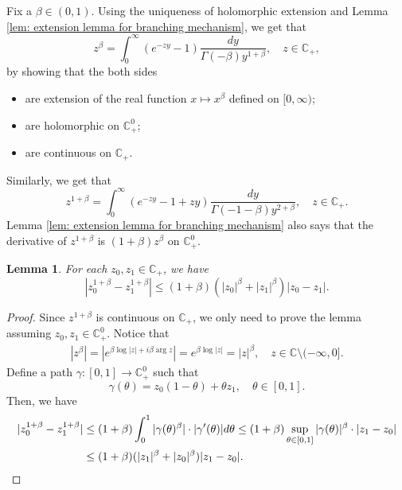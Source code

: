 \documentclass[12pt,a4paper]{amsart}
\theoremstyle{plain}
\newtheorem{lem}[thm]{Lemma}
\theoremstyle{definition}
\numberwithin{equation}{section}
\begin{document}
    Fix a $\beta \in (0,1)$.
    Using the uniqueness of holomorphic extension and Lemma \ref{lem: extension lemma for branching mechanism}, we get that
\begin{equation}
    z^{\beta}
	= \int_0^\infty (e^{-zy}-1) \frac{dy}{\Gamma(-\beta)y^{1+\beta}},
    \quad z\in \mathbb C_+,
\end{equation}
	by showing that the both sides
\begin{itemize}
\item
    are extension of the real function $x\mapsto x^{\beta}$ defined on $[0,\infty)$;
\item
    are holomorphic on $\mathbb C_+^0$;
\item
    are continuous on $\mathbb C_+$.
\end{itemize}
    Similarly, we get that
\begin{equation}
\label{eq: stable branching on C+}
    z^{1+\beta}
    = \int_0^\infty (e^{-zy}-1+zy)\frac{dy}{\Gamma(-1-\beta)y^{2+\beta}},
    \quad z\in \mathbb C_+.
\end{equation}
    Lemma \ref{lem: extension lemma for branching mechanism} also says that the derivative of $z^{1+\beta}$ is $(1+\beta)z^{\beta}$ on $\mathbb C^0_+$.
\begin{lem}
\label{lem: Lip of power function}
    For each $z_0,z_1 \in \mathbb C_+$, we have
\begin{equation}
\label{eq: Lip of power function}
    |z_0^{1+\beta} - z_1^{1+\beta}|
    \leq (1+\beta)(|z_0|^{\beta}+|z_1|^{\beta})|z_0 - z_1|.
\end{equation}

\end{lem}
\begin{proof}
    Since $z^{1+\beta}$ is continuous on $\mathbb C_+$, we only need to prove the lemma assuming $z_0,z_1 \in \mathbb C^0_+$.
    Notice that
\begin{equation}\begin{split}
\label{eq: upper bound for beta power of z}
	|z^\beta|
	= |e^{\beta \log |z| +i\beta \operatorname {arg}z}| = e^{\beta \log |z|} = |z|^\beta,
	\quad z \in \mathbb C\setminus (-\infty, 0].
\end{split}\end{equation}
    Define a path $\gamma: [0,1] \to \mathbb C^0_+$ such that
\[
    \gamma(\theta)
    = z_0 (1-\theta) + \theta z_1,
    \quad \theta \in [0,1].
\]
    Then, we have
\begin{equation}\begin{split}
    |z_0^{1+\beta} - z_1^{1+\beta}|
    &\leq (1+\beta) \int_0^1 |\gamma(\theta)^{\beta}|\cdot |\gamma'(\theta)|d\theta
    \leq (1+\beta)  \sup_{\theta \in [0,1]} |\gamma(\theta)|^{\beta} \cdot |z_1-z_0|
    \\&\leq (1+\beta)  ( |z_1|^{\beta}+|z_0|^{\beta} ) |z_1-z_0|.
    \qedhere
\end{split}\end{equation}
\end{proof}
\end{document}
